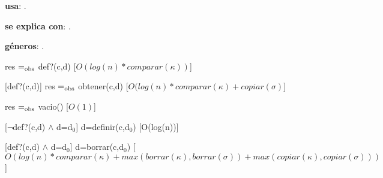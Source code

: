 \begin{Interfaz}
  
  \textbf{usa}: .
  
  \textbf{se explica con}: .

  \textbf{g\'eneros}: .


  {res $=_{\mathrm{obs}}$ def?(c,d)}%
  [$O(log(n) * comparar(\kappa))$]

  [def?(c,d)]
  {res $=_{\mathrm{obs}}$ obtener(c,d)}%
  [$O(log(n) * comparar(\kappa) + copiar(\sigma)$]
  
  {res $=_{\mathrm{obs}}$ vacio()}%
  [$O(1)$]
  
  [$\neg$def?(c,d) $\wedge$ d=d$_0$]
  {d=definir(c,d$_0$)}%
  [O(log(n))]
  
  [def?(c,d) $\wedge$ d=d$_0$]
  {d=borrar(c,d$_0$)}%
  [$O(log(n) * comparar(\kappa) + max(borrar(\kappa), borrar(\sigma)) + max(copiar(\kappa), copiar(\sigma)))$]

\end{Interfaz}

